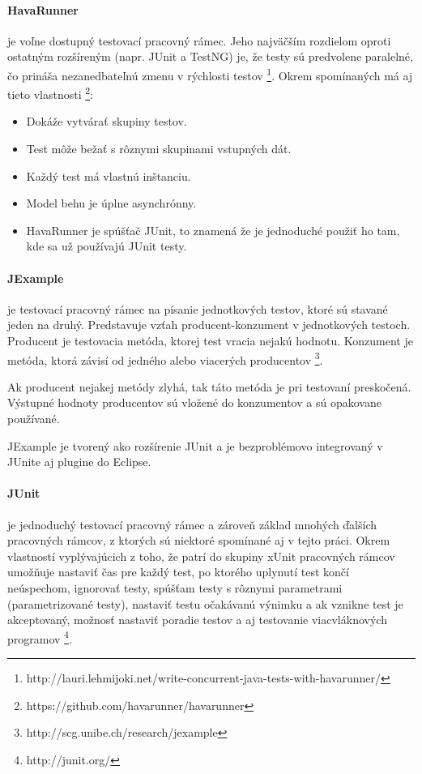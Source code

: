 \documentclass[11pt,twoside,slovak,a4paper]{article}
\begin{document}
	\paragraph{HavaRunner} je voľne dostupný testovací pracovný rámec. Jeho najväčším rozdielom oproti ostatným rozšíreným (napr. JUnit a TestNG) je, že testy sú predvolene paralelné, čo prináša nezanedbateľnú zmenu v rýchlosti testov \footnote{http://lauri.lehmijoki.net/write-concurrent-java-tests-with-havarunner/}.
	Okrem spomínaných má aj tieto vlastnosti \footnote{https://github.com/havarunner/havarunner}:
	\begin{itemize}
		\item Dokáže vytvárať skupiny testov.
		\item Test môže bežať s rôznymi skupinami vstupných dát.
		\item Každý test má vlastnú inštanciu.
		\item Model behu je úplne asynchrónny.
		\item HavaRunner je spúšťač JUnit, to znamená že je jednoduché použiť ho tam, kde sa už používajú JUnit testy.
	\end{itemize}
	
	\paragraph{JExample} je testovací pracovný rámec na písanie jednotkových testov, ktoré sú stavané jeden na druhý. Predstavuje vzťah producent-konzument v jednotkových testoch. Producent je testovacia metóda, ktorej test vracia nejakú hodnotu. Konzument je metóda, ktorá závisí od jedného alebo viacerých producentov \footnote{http://scg.unibe.ch/research/jexample}.
	
	Ak producent nejakej metódy zlyhá, tak táto metóda je pri testovaní preskočená. Výstupné hodnoty producentov sú vložené do konzumentov a sú opakovane používané.
	
	JExample je tvorený ako rozšírenie JUnit a je bezproblémovo integrovaný v JUnite aj plugine do Eclipse.
	
	\paragraph{JUnit} je jednoduchý testovací pracovný rámec a zároveň základ mnohých ďalších pracovných rámcov, z ktorých sú niektoré spomínané aj v tejto práci. Okrem vlastností vyplývajúcich z toho, že patrí do skupiny xUnit pracovných rámcov umožňuje nastaviť čas pre každý test, po ktorého uplynutí test končí neúspechom, ignorovať testy, spúšťam testy s rôznymi parametrami (parametrizované testy), nastaviť testu očakávanú výnimku a ak vznikne test je akceptovaný, možnosť nastaviť poradie testov a aj testovanie viacvláknových programov \footnote{http://junit.org/}. 
	
\end{document}
